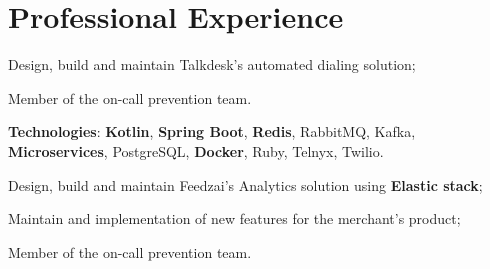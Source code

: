 \documentclass[letterpaper]{deedy-resume} %
\begin{document}
%
\begin{minipage}[t]{0.64\textwidth} %


\section{Professional Experience}
\vspace{0.5mm}

\vspace{4.0mm}
\begin{tightitemize}
	\item Design, build and maintain Talkdesk's automated dialing solution;
	\item Member of the on-call prevention team.
\end{tightitemize}

\vspace{0.75mm}

\textbf{Technologies}: \textbf{Kotlin}, \textbf{Spring Boot}, \textbf{Redis}, RabbitMQ, Kafka, \textbf{Microservices}, PostgreSQL, \textbf{Docker}, Ruby, Telnyx, Twilio.


\vspace{4.5mm}



\vspace{0.5mm}
\begin{tightitemize}
	\item Design, build and maintain Feedzai's Analytics solution using \textbf{Elastic stack};
	\item Maintain and implementation of new features for the merchant's product;
	\item Member of the on-call prevention team.
\end{tightitemize}


\end{minipage}
\end{document}

